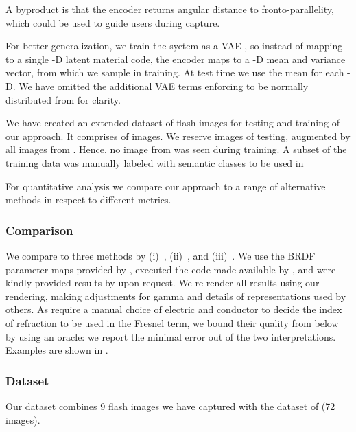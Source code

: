 \documentclass[acmtog, review, anonymous]{acmart}
\begin{document}
A byproduct is that the encoder returns angular distance to fronto-parallelity, which could be used to guide users during capture.

For better generalization, we train the syetem as a \ac{VAE} \cite{kingma2013auto}, so instead of mapping to a single \Zdimension-D latent material code, the encoder \flashImageEncoder maps to a \Zdimension-D mean and variance vector, from which we sample in training.
At test time we use the mean for each \Zdimension-D.
We have omitted the additional \ac{VAE} terms enforcing \materialCode to be normally distributed from  for clarity.


We have created an extended dataset of flash images for testing and training of our approach.
It comprises of  images.
We reserve  images of testing, augmented by all images from \citet{aittala2016reflectance}.
Hence, no image from \citet{aittala2016reflectance} was seen during training.
A subset of the training data was manually labeled with semantic classes to be used in 

For quantitative analysis we compare our approach to a range of alternative methods in respect to different metrics.

\subsubsection{Comparison}
We compare to three methods by (i)~\citet{aittala2016reflectance}, (ii)~\citet{deschaintre2018single}, and (iii)~\citet{li2018materials}.
We use the BRDF parameter maps provided by \citet{aittala2016reflectance}, executed the code made available by \citet{deschaintre2018single}, and were kindly provided results by \citet{li2018materials} upon request.
We re-render all results using our rendering, making adjustments for gamma and details of representations used by others.
As \citet{li2018materials} require a manual choice of electric and conductor to decide the index of refraction to be used in the Fresnel term, we bound their quality from below by using an oracle: we report the minimal error out of the two interpretations.
Examples are shown in . 

\subsubsection{Dataset}
Our dataset combines 9 flash images we have captured with the dataset of \citet{aittala2016reflectance} (72 images).
\end{document}
